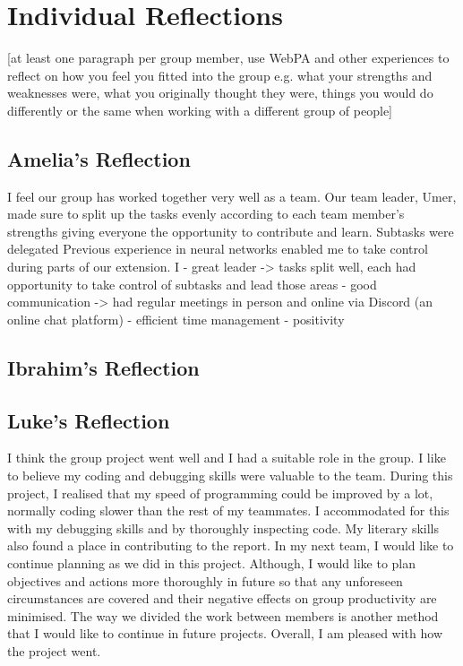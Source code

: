 \documentclass[11pt]{article}
\begin{document}
\section{Individual Reflections}
[at least one paragraph per group member, use WebPA and other experiences to reflect on how you feel you fitted into the group e.g. what your strengths and weaknesses were, what you originally thought they were, things you would do differently or the same when working with a different group of people]
\subsection{Amelia's Reflection}
I feel our group has worked together very well as a team. Our team leader, Umer, made sure to split up the tasks evenly according to each team member's strengths giving everyone the opportunity to contribute and learn. Subtasks were delegated 
Previous experience in neural networks enabled me to take control during parts of our extension. I 
- great leader -> tasks split well, each had opportunity to take control of subtasks and lead those areas
- good communication -> had regular meetings in person and online via Discord (an online chat platform)
- efficient time management
- positivity

\subsection{Ibrahim's Reflection}

\subsection{Luke's Reflection}
I think the group project went well and I had a suitable role in the group.
I like to believe my coding and debugging skills were valuable to the team.
During this project, I realised that my speed of programming could be improved by a lot,
normally coding slower than the rest of my teammates. I accommodated for this
with my debugging skills and by thoroughly inspecting code.
My literary skills also found a place in contributing to the report.
In my next team, I would like to continue planning as we did in this project.
Although, I would like to plan objectives and actions more thoroughly in future so that
any unforeseen circumstances are covered and their negative effects on group 
productivity are minimised. The way we divided the work between members is another
method that I would like to continue in future projects.
Overall, I am pleased with how the project went.
\end{document}
